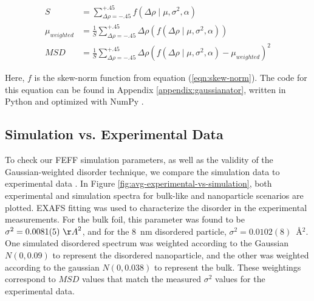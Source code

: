 
\begin{align}
	\label{eqn:updated-weighted-MSD}
	S &= \sum_{\Delta\rho=-.45}^{+.45} f\left(\Delta \rho \mid \mu, \sigma^2, \alpha \right) \\
	\mu_{weighted} &= \frac{1}{S} \sum_{\Delta\rho=-.45}^{+.45} \Delta\rho \left( f ( \Delta \rho \mid \mu, \sigma^2, \alpha ) \right) \\
	MSD &= \frac{1}{S} \sum_{\Delta\rho=-.45}^{+.45} \Delta \rho \left( f ( \Delta \rho \mid \mu, \sigma^2, \alpha ) - \mu_{weighted} \right) ^2
\end{align}

\noindent Here, $ f $ is the skew-norm function from equation (\ref{eqn:skew-norm}). The code for this equation can be found in Appendix \ref{appendix:gaussianator}, written in Python and optimized with NumPy \cite{numpy}.

\subsection{Simulation vs. Experimental Data} \label{sec:end-disorder}

To check our FEFF simulation parameters, as well as the validity of the Gaussian-weighted disorder technique, we compare the simulation data to experimental data \cite{au-nanowires-silca-wang} \cite{crooks-55nm-au-exp} \cite{jing-au-nanoparticle-exp} \cite{au-nanowires-silca-wang}. In Figure \ref{fig:avg-experimental-vs-simulation}, both experimental and simulation spectra for bulk-like and nanoparticle scenarios are plotted. EXAFS fitting was used to characterize the disorder in the experimental measurements. For the bulk foil, this parameter was found to be $ \sigma^2=0.0081(5)~{\AA}^2 $, and for the 8~nm disordered particle, $ \sigma^2=0.0102(8) $~{\AA}$ ^2 $.  One simulated disordered spectrum was weighted according to the Gaussian $ N(0, 0.09) $ to represent the disordered nanoparticle, and the other was weighted according to the gaussian $ N(0, 0.038)  $ to represent the bulk. These weightings correspond to $ MSD $ values that match the measured $ \sigma^2 $ values for the experimental data.  

